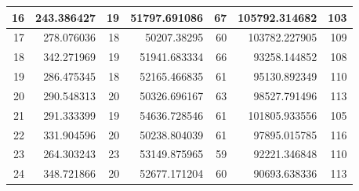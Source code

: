 \begin{table}
\begin{adjustwidth}{}{}
{{\begin{tabular}{|r|r|r|r|r|r|r|}
					\hline
					16                                         & 243.386427                   & 19                                    & 51797.691086                   & 67                                    & 105792.314682                & 103                                    \\ 
					\hline
					17                                         & 278.076036                   & 18                                    & 50207.38295                    & 60                                    & 103782.227905                & 109                                    \\ 
					\hline
					18                                         & 342.271969                   & 19                                    & 51941.683334                   & 66                                    & 93258.144852                 & 108                                    \\ 
					\hline
					19                                         & 286.475345                   & 18                                    & 52165.466835                   & 61                                    & 95130.892349                 & 110                                    \\ 
					\hline
					20                                         & 290.548313                   & 20                                    & 50326.696167                   & 63                                    & 98527.791496                 & 113                                    \\ 
					\hline
					21                                         & 291.333399                   & 19                                    & 54636.728546                   & 61                                    & 101805.933556                & 105                                    \\ 
					\hline
					22                                         & 331.904596                   & 20                                    & 50238.804039                   & 61                                    & 97895.015785                 & 116                                    \\ 
					\hline
					23                                         & 264.303243                   & 23                                    & 53149.875965                   & 59                                    & 92221.346848                 & 110                                    \\ 
					\hline
					24                                         & 348.721866                   & 20                                    & 52677.171204                   & 60                                    & 90693.638336                 & 113                                    \\ 

\end{tabular}}}
\end{adjustwidth}
\end{table}
